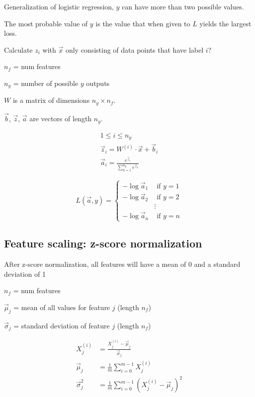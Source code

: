 \documentclass[12pt]{article}
\begin{document}
Generalization of logistic regression, $y$ can have more than two possible values.

The most probable value of $y$ is the value that when given to $L$ yields the largest loss.

Calculate $z_i$ with $\vec{x}$ only consisting of data points that have label $i$?

$n_f$ = num features

$n_y$ = number of possible $y$ outputs

$W$ is a matrix of dimensions $n_y \times n_f$.

$\vec{b}$, $\vec{z}$, $\vec{a}$ are vectors of length $n_y$.

\begin{gather*}
1 \leq i \leq n_y\\
\vec{z}_i = W^{(i)} \cdot \vec{x} + \vec{b}_i\\
\vec{a}_i = \frac{e^{\vec{z}_i}}{\sum_{k=1}^{n_y} e^{\vec{z}_k}}
\end{gather*}

\begin{equation}
L(\vec{a}, y) =
  \left\{
    \begin{aligned}
    -\log \vec{a}_1 &\text{ if } y = 1\\
    -\log \vec{a}_2 &\text{ if } y = 2\\
    & \vdots\\
    -\log \vec{a}_n &\text{ if } y = n
    \end{aligned}
   \right.
\end{equation}

\subsection{Feature scaling: z-score normalization}

After z-score normalization, all features will have a mean of 0 and a standard deviation of 1

$n_f$ = num features

$\vec{\mu}_j$ = mean of all values for feature $j$ (length $n_f$)

$\vec{\sigma}_j$ = standard deviation of feature $j$ (length $n_f$)

\begin{align*}
X_j^{(i)} &= \frac{X_j^{(i)} - \vec{\mu}_j}{\vec{\sigma}_j}\\
\vec{\mu}_j &= \frac{1}{m} \sum_{i=0}^{m-1} X_j^{(i)}\\
\vec{\sigma}_j^2 &= \frac{1}{m} \sum_{i=0}^{m-1} (X_j^{(i)} - \vec{\mu}_j)^2
\end{align*}
\end{document}
